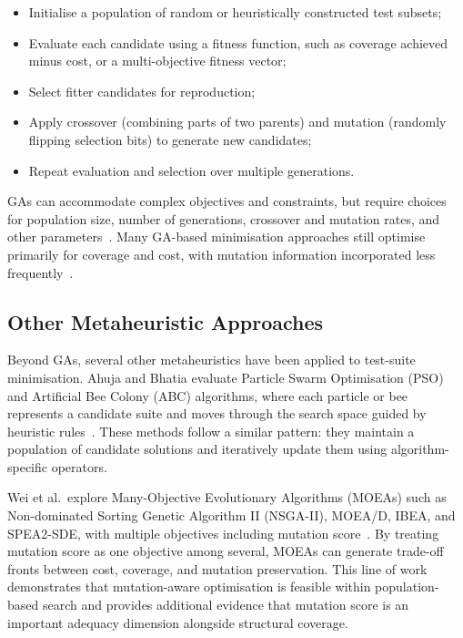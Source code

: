 \begin{itemize}
  \item Initialise a population of random or heuristically constructed test subsets;
  \item Evaluate each candidate using a fitness function, such as coverage achieved
        minus cost, or a multi-objective fitness vector;
  \item Select fitter candidates for reproduction;
  \item Apply crossover (combining parts of two parents) and mutation
        (randomly flipping selection bits) to generate new candidates;
  \item Repeat evaluation and selection over multiple generations.
\end{itemize}

GAs can accommodate complex objectives and constraints, but require choices for
population size, number of generations, crossover and mutation rates, and other
parameters~\cite{yoo2012,khan2020}. Many GA-based minimisation approaches still
optimise primarily for coverage and cost, with mutation information incorporated
less frequently~\cite{noemmer2020}.

\subsection{Other Metaheuristic Approaches}

Beyond GAs, several other metaheuristics have been applied to test-suite
minimisation. Ahuja and Bhatia evaluate Particle Swarm Optimisation (PSO)
and Artificial Bee Colony (ABC) algorithms, where each particle or bee
represents a candidate suite and moves through the search space guided by
heuristic rules~\cite{ahuja2024}. These methods follow a similar pattern:
they maintain a population of candidate solutions and iteratively update
them using algorithm-specific operators.

Wei et al.\ explore Many-Objective Evolutionary Algorithms (MOEAs) such as
Non-dominated Sorting Genetic Algorithm II (NSGA-II), MOEA/D, IBEA, and
SPEA2-SDE, with multiple objectives including mutation score~\cite{wei2017}.
By treating mutation score as one objective among several, MOEAs can generate
trade-off fronts between cost, coverage, and mutation preservation. This line
of work demonstrates that mutation-aware optimisation is feasible within
population-based search and provides additional evidence that mutation score
is an important adequacy dimension alongside structural coverage.


